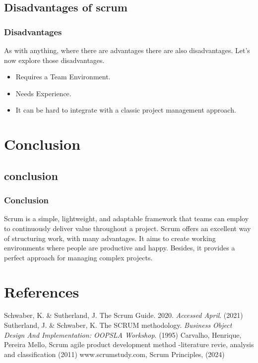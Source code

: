 \documentclass[
	11pt, %
]{beamer}
\begin{document}
\subsection{Disadvantages of scrum}
\begin{frame}
	\frametitle{Disadvantages}
	As with anything, where there are advantages there are also disadvantages. Let's now explore those disadvantages.
	\\
	\begin{itemize}
			\item Requires a Team Environment.
			\item Needs Experience.
			\item  It can be hard to integrate with a classic project management approach.
	\end{itemize}
\end{frame}


\section{Conclusion}
\subsection{conclusion}

\begin{frame}
	\frametitle{Conclusion}
	Scrum is a simple, lightweight, and adaptable framework that 
	teams can employ to continuously deliver value throughout a project.
	Scrum offers an excellent way of structuring work, with many advantages.
	It aims to create working environments where people are productive and happy.
	Besides, it provides a perfect approach for managing complex projects.
\end{frame}

\section{References}

\begin{frame}[allowframebreaks] %
	\begin{thebibliography}{91}
		Schwaber, K. \& Sutherland, J. The Scrum Guide. 2020. {\em Accessed April}. (2021)
        Sutherland, J. \& Schwaber, K. The SCRUM methodology. {\em Business Object Design And Implementation: OOPSLA Workshop}. (1995)
		Carvalho, Henrique, Pereira Mello, Scrum agile product development 
		method -literature revie, analysis and classification (2011)
		 www.scrumstudy.com, Scrum Principles, (2024)
	\end{thebibliography}
\end{frame}
\end{document}
